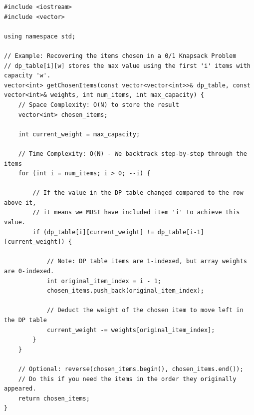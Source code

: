 \begin{lstlisting}
#include <iostream>
#include <vector>

using namespace std;

// Example: Recovering the items chosen in a 0/1 Knapsack Problem
// dp_table[i][w] stores the max value using the first 'i' items with capacity 'w'.
vector<int> getChosenItems(const vector<vector<int>>& dp_table, const vector<int>& weights, int num_items, int max_capacity) {
    // Space Complexity: O(N) to store the result
    vector<int> chosen_items;
    
    int current_weight = max_capacity;

    // Time Complexity: O(N) - We backtrack step-by-step through the items
    for (int i = num_items; i > 0; --i) {
        
        // If the value in the DP table changed compared to the row above it,
        // it means we MUST have included item 'i' to achieve this value.
        if (dp_table[i][current_weight] != dp_table[i-1][current_weight]) {
            
            // Note: DP table items are 1-indexed, but array weights are 0-indexed.
            int original_item_index = i - 1;
            chosen_items.push_back(original_item_index);
            
            // Deduct the weight of the chosen item to move left in the DP table
            current_weight -= weights[original_item_index];
        }
    }
    
    // Optional: reverse(chosen_items.begin(), chosen_items.end()); 
    // Do this if you need the items in the order they originally appeared.
    return chosen_items;
}
\end{lstlisting}
